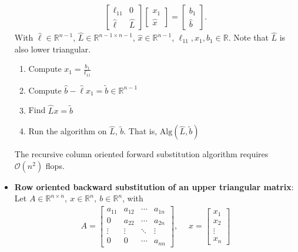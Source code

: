 \documentclass{report}
\begin{document}
\begin{itemize}
\begin{align*}
\begin{bmatrix}
                    \ell_{11} & 0 \\
                    \hat{\ell} & \hat{L}
                \end{bmatrix}
                \begin{bmatrix}
                    x_{1} \\ \hat{x} 
                \end{bmatrix}
                = \begin{bmatrix}
                    b_{1} \\ \hat{b}
                \end{bmatrix}
            .\end{align*}
            With $\hat{\ell} \in \mathbb{R}^{n-1}$, $\hat{L} \in \mathbb{R}^{n-1 \times n-1} $, $\hat{x} \in \mathbb{R}^{n-1}$, $\ell_{11}, x_{1}, b_{1} \in \mathbb{R}$. Note that $\hat{L}$ is also lower triangular.
            \begin{enumerate}
                \item Compute $x_{1} = \frac{b_{1}}{\ell_{11}} $
                \item Compute $\hat{b} - \hat{\ell}x_{1} = \tilde{b} \in \mathbb{R}^{n-1} $
                \item Find $\hat{L}x = \tilde{b} $
                \item Run the algorithm on $\hat{L}$, $\tilde{b}$. That is, $\text{Alg}(\hat{L}, \tilde{b}) $
            \end{enumerate}
            The recursive column oriented forward substitution algorithm requires $\mathcal{O}(n^{2})$ flops.
        \item \textbf{Row oriented backward substitution of an upper triangular matrix}:
            Let $A \in \mathbb{R}^{n\times n},\ x \in \mathbb{R}^{n},\ b \in \mathbb{R}^{n}$, with
            \begin{align*}
                A = \begin{bmatrix}
                    a_{11} & a_{12} & \cdots & a_{1n} \\
                    0 & a_{22} & \cdots & a_{2n} \\
                    \vdots & \vdots & \ddots & \vdots \\
                    0 & 0 & \cdots & a_{nn}
                \end{bmatrix},  \quad \;
                x = \begin{bmatrix}
                    x_{1} \\ x_{2} \\ \vdots \\ x_{n}

\end{bmatrix}
\end{align*}
\end{itemize}
\end{document}
